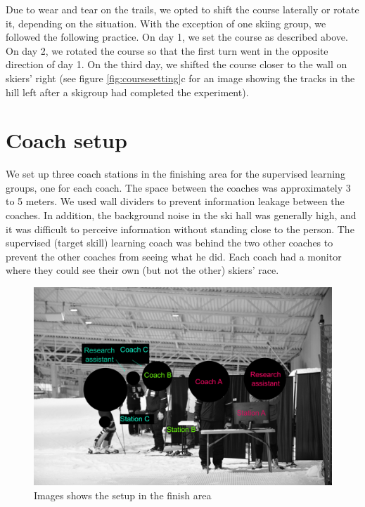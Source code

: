\documentclass[pdflatex,sn-mathphys-num]{sn-jnl}%
\theoremstyle{thmstyleone}%
\theoremstyle{thmstyletwo}%
\theoremstyle{thmstylethree}%
\begin{document}
\begin{appendices}
Due to wear and tear on the trails, we opted to shift the course laterally or rotate it, depending on the situation. With the exception of one skiing group, we followed the following practice. On day 1, we set the course as described above. On day 2, we rotated the course so that the first turn went in the opposite direction of day 1. On the third day, we shifted the course closer to the wall on skiers' right (see figure \ref{fig:coursesetting}c for an image showing the tracks in the hill left after a skigroup had completed the experiment). 


\section{Coach setup}
We set up three coach stations in the finishing area for the supervised learning groups, one for each coach. The space between the coaches was approximately 3 to 5 meters. We used wall dividers to prevent information leakage between the coaches. In addition, the background noise in the ski hall was generally high, and it was difficult to perceive information without standing close to the person. The supervised (target skill) learning coach was behind the two other coaches to prevent the other coaches from seeing what he did. Each coach had a monitor where they could see their own (but not the other) skiers' race.

\begin{figure}[H]
\centering
\includegraphics[width=\linewidth]{figures/figure_stations3.jpg}
\caption{Images shows the setup in the finish area
}
\label{fig:coachstation}
\end{figure}
 





\end{appendices}
\end{document}
